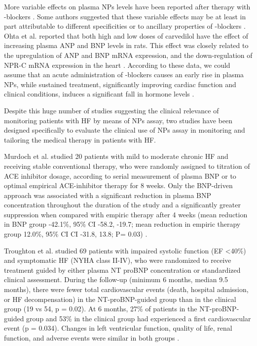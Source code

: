 \documentclass[14pt,a4paper,onecolumn]{extarticle}
\begin{document}
More variable effects on plasma NPs levels have been reported after therapy with \beta-blockers \citep{bib390} \citep{bib3278} \citep{bib3279} \citep{bib3280} \citep{bib3281} \citep{bib3282} \citep{bib3283} \citep{bib3284} \citep{bib3285} \citep{bib3286} \citep{bib3287} \citep{bib3288} \citep{bib3289} \citep{bib3290} \citep{bib3291} \citep{bib3292}. Some authors suggested that these variable effects may be at least in part attributable to different specificities or to ancillary properties of \beta-blockers \citep{bib362}. Ohta et al. \citep{bib3293} reported that both high and low doses of carvedilol have the effect of increasing plasma ANP and BNP levels in rats. This effect was closely related to the upregulation of ANP and BNP mRNA expression, and the down-regulation of NPR-C mRNA expression in the heart \citep{bib3293}. According to these data, we could assume that an acute administration of \beta-blockers causes an early rise in plasma NPs, while sustained treatment, significantly improving cardiac function and clinical conditions, induces a significant fall in hormone levels \citep{bib390} \citep{bib3284} \citep{bib3287} \citep{bib3289} \citep{bib3290}.



Despite this huge number of studies suggesting the clinical relevance of monitoring patients with HF by means of NPs assay, two studies \citep{bib3252} \citep{Troughton2000} have been designed specifically to evaluate the clinical use of NPs assay in monitoring and tailoring the medical therapy in patients with HF.

Murdoch et al. \citep{bib3252} studied 20 patients with mild to moderate chronic HF and receiving stable conventional therapy, who were randomly assigned to titration of ACE inhibitor dosage, according to serial measurement of plasma BNP or to optimal empirical ACE-inhibitor therapy for 8 weeks. Only the BNP-driven approach was associated with a significant reduction in plasma BNP concentration throughout the duration of the study and a significantly greater suppression when compared with empiric therapy after 4 weeks (mean reduction in BNP group -42.1\%, 95\% CI -58.2, -19.7; mean reduction in empiric therapy group  12.0\%, 95\% CI CI -31.8, 13.8; P= 0.03) \citep{bib3252}.



Troughton et al. studied 69 patients with impaired systolic function (EF <40\%) and symptomatic HF (NYHA class II-IV), who were randomized to receive treatment guided by either plasma NT proBNP concentration or standardized clinical assessment. During the follow-up (minimum 6 months, median 9.5 months), there were fewer total cardiovascular events (death, hospital admission, or HF decompensation) in the NT-proBNP-guided group than in the clinical group (19 vs 54, p = 0.02). At 6 months, 27\% of patients in the NT-proBNP-guided group and 53\% in the clinical group had experienced a first cardiovascular event (p = 0.034). Changes in left ventricular function, quality of life, renal function, and adverse events were similar in both groups \citep{Troughton2000}.
\end{document}

